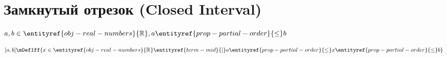 
\section{Замкнутый отрезок (Closed Interval)}

\hypertarget{obj-closed-interval}{}
\hypertarget{obj-closed-interval}{}
\begin{object}
\label{entity:obj-closed-interval}
$a, b \in \entityref{obj-real-numbers}{\mathbb{R}}, a \entityref{prop-partial-order}{\le} b$

\[ [a,b] \mDefIff \{ x \in \entityref{obj-real-numbers}{\mathbb{R}} \entityref{term-mid}{\mid} a \entityref{prop-partial-order}{\le} x \entityref{prop-partial-order}{\le} b \} \]
\end{object}